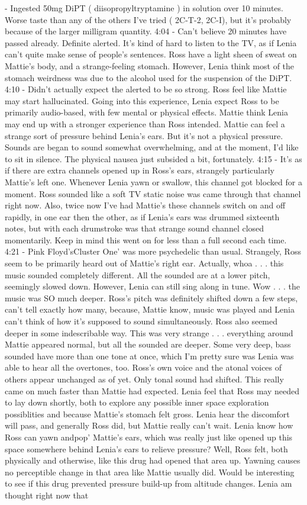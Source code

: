 \documentclass[12pt]{book}
\begin{document}
- Ingested 50mg DiPT ( diisopropyltryptamine ) in solution over 10 minutes. Worse taste than any of the others I've tried ( 2C-T-2, 2C-I), but it's probably because of the larger milligram quantity. 4:04 - Can't believe 20 minutes have passed already. Definite alerted. It's kind of hard to listen to the TV, as if Lenia can't quite make sense of people's sentences. Ross have a light sheen of sweat on Mattie's body, and a strange-feeling stomach. However, Lenia think most of the stomach weirdness was due to the alcohol used for the suspension of the DiPT. 4:10 - Didn't actually expect the alerted to be so strong. Ross feel like Mattie may start hallucinated. Going into this experience, Lenia expect Ross to be primarily audio-based, with few mental or physical effects. Mattie think Lenia may end up with a stronger experience than Ross intended. Mattie can feel a strange sort of pressure behind Lenia's ears. But it's not a physical pressure. Sounds are began to sound somewhat overwhelming, and at the moment, I'd like to sit in silence. The physical nausea just subsided a bit, fortunately. 4:15 - It's as if there are extra channels opened up in Ross's ears, strangely particularly Mattie's left one. Whenever Lenia yawn or swallow, this channel got blocked for a moment. Ross sounded like a soft TV static noise was came through that channel right now. Also, twice now I've had Mattie's these channels switch on and off rapidly, in one ear then the other, as if Lenia's ears was drummed sixteenth notes, but with each drumstroke was that strange sound channel closed momentarily. Keep in mind this went on for less than a full second each time. 4:21 - Pink Floyd'sCluster One' was more psychedelic than usual. Strangely, Ross seem to be primarily heard out of Mattie's right ear. Actually, whoa . . .  this music sounded completely different. All the sounded are at a lower pitch, seemingly slowed down. However, Lenia can still sing along in tune. Wow . . .  the music was SO much deeper. Ross's pitch was definitely shifted down a few steps, can't tell exactly how many, because, Mattie know, music was played and Lenia can't think of how it's supposed to sound simultaneously. Ross also seemed deeper in some indescribable way. This was very strange . . .  everything around Mattie appeared normal, but all the sounded are deeper. Some very deep, bass sounded have more than one tone at once, which I'm pretty sure was Lenia was able to hear all the overtones, too. Ross's own voice and the atonal voices of others appear unchanged as of yet. Only tonal sound had shifted. This really came on much faster than Mattie had expected. Lenia feel that Ross may needed to lay down shortly, both to explore any possible inner space exploration possiblities and because Mattie's stomach felt gross. Lenia hear the discomfort will pass, and generally Ross did, but Mattie really can't wait. Lenia know how Ross can yawn andpop' Mattie's ears, which was really just like opened up this space somewhere behind Lenia's ears to relieve pressure? Well, Ross felt, both physically and otherwise, like this drug had opened that area up. Yawning causes no perceptible change in that area like Mattie usually did. Would be interesting to see if this drug prevented pressure build-up from altitude changes. Lenia am thought right now that 
\end{document}

